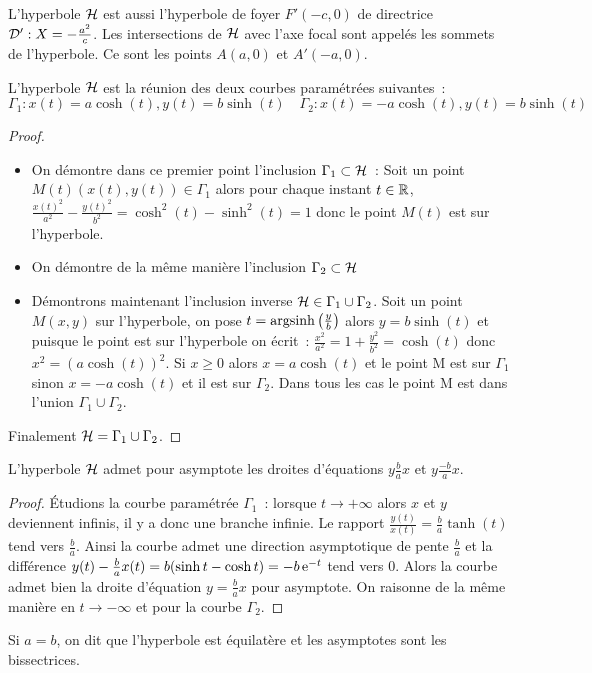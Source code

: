 L'hyperbole $\mathcal{H}$ est aussi l'hyperbole de foyer $F'(-c,0)$ de directrice $\mathcal{D} ':X=-\frac{a^2}{c}$. Les intersections de $\mathcal{H}$ avec l'axe focal sont appelés les sommets de l'hyperbole. Ce sont les points $A(a,0)$ et $A'(-a,0)$.
\begin{prop}
  L'hyperbole $\mathcal{H}$ est la réunion des deux courbes paramétrées suivantes~:
  \begin{equation}
    \Gamma_1 : x(t)=a\cosh(t), y(t)=b\sinh(t) \quad \Gamma_2 : x(t)=-a\cosh(t), y(t)=b\sinh(t)
  \end{equation}
\end{prop}
\begin{proof}
  \begin{itemize}
  \item On démontre dans ce premier point l'inclusion $\Gamma_1 \subset \mathcal{H}$~: Soit un point $M(t)(x(t),y(t)) \in \Gamma_1$ alors pour chaque instant $t \in \mathbb{R}$, $\frac{x(t)^2}{a^2}-\frac{y(t)^2}{b^2}=\cosh^2(t)-\sinh^2(t)=1$ donc le point $M(t)$ est sur l'hyperbole.
  \item On démontre de la même manière l'inclusion  $\Gamma_2 \subset \mathcal{H}$
  \item Démontrons maintenant l'inclusion inverse $\mathcal{H} \in \Gamma_1\cup\Gamma_2$. Soit un point $M(x,y)$ sur l'hyperbole, on pose $t=\operatorname{argsinh}\left(\frac{y}{b}\right)$ alors $y=b\sinh(t)$ et puisque le point est sur l'hyperbole on écrit~: $\frac{x^2}{a^2}=1+\frac{y^2}{b^2}=\cosh(t)$ donc $x^2=(a\cosh(t))^2$. Si $x\geq 0$ alors $x=a\cosh(t)$ et le point M est sur $\Gamma_1$ sinon $x=-a\cosh(t)$ et il est sur $\Gamma_2$. Dans tous les cas le point M est dans l'union $\Gamma_1 \cup \Gamma_2$.
  \end{itemize}
Finalement $\mathcal{H}=\Gamma_1 \cup \Gamma_2$.
\end{proof}
\begin{prop}
  L'hyperbole $\mathcal{H}$ admet pour asymptote les droites d'équations $y\frac{b}{a}x$ et $y\frac{-b}{a}x$.
\end{prop}
\begin{proof}
  Étudions la courbe paramétrée $\Gamma_1$~: lorsque $t \to +\infty$ alors $x$ et $y$ deviennent infinis, il y a donc une branche infinie. Le rapport $\frac{y(t)}{x(t)}=\frac{b}{a} \tanh(t)$ tend vers $\frac{b}{a}$. Ainsi la courbe admet une direction asymptotique de pente $\frac{b}{a}$ et la différence $y(t) -\frac{b}{a}x(t)=b(\sinh t -\cosh t)=-b\operatorname{e}^{-t}$ tend vers 0. Alors la courbe admet bien la droite d'équation $y=\frac{b}{a}x$ pour asymptote. On raisonne de la même manière en $t\to -\infty$ et pour la courbe $\Gamma_2$.
\end{proof}
Si $a=b$, on dit que l'hyperbole est équilatère et les asymptotes sont les bissectrices.


